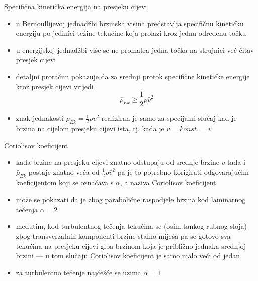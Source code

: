 \documentclass{beamer}
\begin{document}
\begin{frame}{Specifična kinetička energija na presjeku cijevi}

\begin{itemize}
\item u Bernoullijevoj jednadžbi brzinska visina predstavlja specifičnu
kinetičku energiju po jedinici težine tekućine koja prolazi kroz jednu
određenu točku
\item u energijskoj jednadžbi više se ne promatra jedna točka na strujnici
već čitav presjek cijevi
\item detaljni proračun pokazuje da za srednji protok specifične kinetičke
energije kroz presjek cijevi vrijedi
\[
\bar{\rho}_{Ek}\geq\frac{1}{2}\rho\bar{v}^{2}
\]
\item znak jednakosti $\bar{\rho}_{Ek}=\frac{1}{2}\rho\bar{v}^{2}$ realiziran
je samo za specijalni slučaj kad je brzina na cijelom presjeku cijevi
ista, tj. kada je $v=konst.=\bar{v}$
\end{itemize}
\end{frame}

\begin{frame}{Coriolisov koeficijent}

\begin{itemize}
\item kada brzine na presjeku cijevi znatno odstupaju od srednje brzine
$\bar{v}$ tada i $\bar{\rho}_{Ek}$ postaje znatno veća od $\frac{1}{2}\rho\bar{v}^{2}$
pa je to potrebno korigirati odgovarajućim koeficijentom koji se označava
s $\alpha$, a naziva \alert{Coriolisov koeficijent}
\item može se pokazati da je zbog parabolične raspodjele brzina kod laminarnog
tečenja $\alpha=2$
\item međutim, kod turbulentnog tečenja tekućina se (osim tankog rubnog
sloja) zbog transverzalnih komponenti brzine stalno miješa pa se gotovo
sva tekućina na presjeku cijevi giba brzinom koja je približno jednaka
srednjoj brzini --- u tom slučaju Coriolisov koeficijent je samo
malo veći od jedan
\end{itemize}
\begin{block}{}

\begin{itemize}
\item za turbulentno tečenje najčešće se uzima $\alpha=1$
\end{itemize}
\end{block}
\end{frame}
\end{document}
